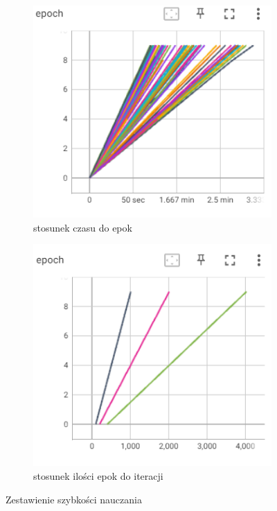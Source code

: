 \documentclass[12pt,twoside]{article}
\begin{document}
\begin{figure}[ht]
	\centering
	\begin{subfigure}[b]{0.4\textwidth}
	  \includegraphics[width=\textwidth]{figures/epokiodczasu.png}
	  \caption{stosunek czasu do epok }
	  \label{fig:obraz1}
	\end{subfigure}
	\hfill
	\begin{subfigure}[b]{0.4\textwidth}
	  \includegraphics[width=\textwidth]{figures/epokiodilościkroków.png}
	  \caption{stosunek ilości epok do iteracji }
	  \label{fig:obraz2}
	\end{subfigure}
	\caption{Zestawienie szybkości nauczania }
	
\end{figure}
\end{document}
